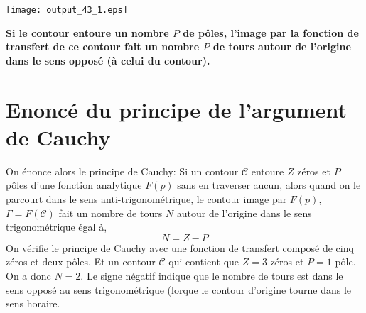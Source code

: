 \begin{center}
    \texttt{[image: output\_43\_1.eps]}
\end{center}
\textbf{Si le contour entoure un nombre \(P\) de pôles, l'image par la
fonction de transfert de ce contour fait un nombre \(P\) de tours autour
de l'origine dans le sens opposé (à celui du contour).} 
\section{Enoncé du principe de l'argument de Cauchy}
On énonce alors le principe de Cauchy:
Si un contour \(\mathcal{C}\) entoure \(Z\) zéros et \(P\) pôles d'une
fonction analytique \(F(p)\) sans en traverser aucun, alors quand on le
parcourt dans le sens anti-trigonométrique, le contour image par
\(F(p)\), \(\Gamma=F(\mathcal{C})\) fait un nombre de tours \(N\) autour
de l'origine dans le sens trigonométrique égal à,
\[
    N=Z-P
\]
On vérifie le principe de Cauchy avec une fonction de transfert composé
de cinq zéros et deux pôles. Et un contour \(\mathcal{C}\) qui contient 
que \(Z=3\) zéros et \(P=1\) pôle. On a donc \(N=2\). Le signe négatif
indique que le nombre de tours est dans le sens opposé au sens
trigonométrique (lorque le contour d'origine tourne dans le sens
horaire.
